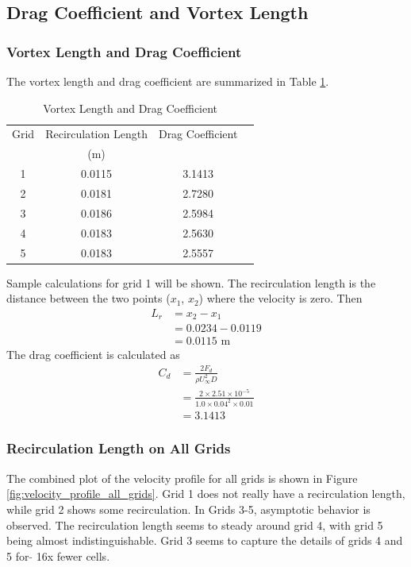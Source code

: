 \subsection{Drag Coefficient and Vortex Length}
\subsubsection{Vortex Length and Drag Coefficient}
The vortex length and drag coefficient are summarized in Table \ref{tab:vortex_length_drag_coefficient_summary}. 
\begin{table}[H]
    \centering
    \caption{Vortex Length and Drag Coefficient}
    \label{tab:vortex_length_drag_coefficient_summary}
    \begin{tabular}{cccc}
        \toprule
        Grid & Recirculation Length & Drag Coefficient \\
        & (m) & \\
        \midrule
        1 & 0.0115 & 3.1413 \\
        2 & 0.0181 & 2.7280 \\
        3 & 0.0186 & 2.5984 \\
        4 & 0.0183 & 2.5630 \\
        5 & 0.0183 & 2.5557 \\
        \bottomrule
    \end{tabular}
\end{table}
Sample calculations for grid 1 will be shown. The recirculation length is the distance between the two points ($x_1$, $x_2$) where the velocity is zero. Then
\begin{align*}
    L_r &= x_2 - x_1 \\
    &= 0.0234 - 0.0119 \\
    &= 0.0115 \text{ m}
\end{align*}
The drag coefficient is calculated as
\begin{align*}
    C_d &= \frac{2F_d}{\rho U_\infty^2 D} \\
    &= \frac{2 \times 2.51 \times 10^{-5}}{1.0 \times 0.04^2 \times 0.01} \\
    &= 3.1413
\end{align*}

\subsubsection{Recirculation Length on All Grids}
The combined plot of the velocity profile for all grids is shown in Figure \ref{fig:velocity_profile_all_grids}. Grid 1 does not really have a recirculation length, while grid 2 shows some recirculation. In Grids 3-5, asymptotic behavior is observed. The recirculation length seems to steady around grid 4, with grid 5 being almost indistinguishable. Grid 3 seems to capture the details of grids 4 and 5 for $\tilde{}$ 16x fewer cells.

